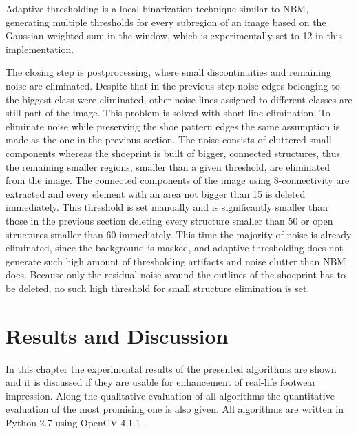 \documentclass[draft,final]{vutinfth} %
\begin{document}
Adaptive thresholding is a local binarization technique similar to NBM, generating multiple thresholds for every subregion of an image based on the Gaussian weighted sum in the window, which is experimentally set to 12 in this implementation.
\par
The closing step is postprocessing, where small discontinuities and remaining noise are eliminated.
Despite that in the previous step noise edges belonging to the biggest class were eliminated, other noise lines assigned to different classes are still part of the image.
This problem is solved with short line elimination.
To eliminate noise while preserving the shoe pattern edges the same assumption is made as the one in the previous section.
The noise consists of cluttered small components whereas the shoeprint is built of bigger, connected structures, thus the remaining smaller regions, smaller than a given threshold, are eliminated from the image.
The connected components of the image using 8-connectivity are extracted and every element with an area not bigger than 15 is deleted immediately.
This threshold is set manually and is significantly smaller than those in the previous section deleting every structure smaller than 50 or open structures smaller than 60 immediately.
This time the majority of noise is already eliminated, since the background is masked, and adaptive thresholding does not generate such high amount of thresholding artifacts and noise clutter than NBM does.
Because only the residual noise around the outlines of the shoeprint has to be deleted, no such high threshold for small structure elimination is set.

\chapter{Results and Discussion}
\label{results}
\par
In this chapter the experimental results of the presented algorithms are shown and it is discussed if they are usable for enhancement of real-life footwear impression.
Along the qualitative evaluation of all algorithms the quantitative evaluation of the most promising one is also given.
All algorithms are written in Python 2.7 \cite{van1995python} using OpenCV 4.1.1 \cite{opencv_library}.
\end{document}
